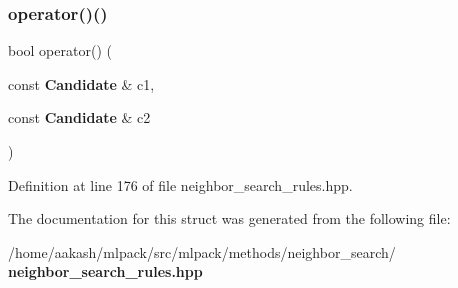 \subsubsection{operator()()}
{\footnotesize\ttfamily bool operator() (\begin{DoxyParamCaption}\item[{const \textbf{ Candidate} \&}]{c1,  }\item[{const \textbf{ Candidate} \&}]{c2 }\end{DoxyParamCaption})\hspace{0.3cm}{\ttfamily [inline]}}



Definition at line 176 of file neighbor\+\_\+search\+\_\+rules.\+hpp.



The documentation for this struct was generated from the following file\+:\begin{DoxyCompactItemize}
\item 
/home/aakash/mlpack/src/mlpack/methods/neighbor\+\_\+search/\textbf{ neighbor\+\_\+search\+\_\+rules.\+hpp}\end{DoxyCompactItemize}
